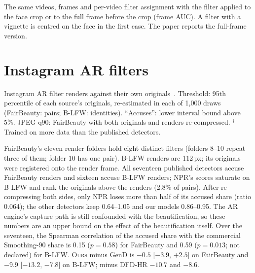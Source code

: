 \documentclass[10pt]{article}
\newcommand{\ours}{\textsc{Ours}}
\begin{document}
\begin{table}[H]
\centering
\caption{The same videos, frames and per-video filter assignment with the filter applied to the face crop or to the full frame
before the crop (frame AUC). A filter with a vignette is centred on the face in the first case. The paper reports the full-frame
version.}
\label{tab:fullframe}
\footnotesize
\begin{adjustbox}{max width=\linewidth}\end{adjustbox}
\end{table}

\section{Instagram AR filters}
\label{sec:ar}
\begin{table}[H]
\centering
\caption{Instagram AR filter renders against their own originals~\cite{openfilter2022}. Threshold: 95th percentile of each source's
originals, re-estimated in each of 1,000 draws (FairBeauty: pairs; B-LFW: identities). ``Accuses'': lower interval bound above
5\%. JPEG q90: FairBeauty with both originals and renders re-compressed. $^\dagger$Trained on more data than the published
detectors.}
\label{tab:ar}
\scriptsize
\begin{adjustbox}{max width=\linewidth}\end{adjustbox}
\end{table}
FairBeauty's eleven render folders hold eight distinct filters (folders 8--10 repeat three of them; folder 10 has one pair). B-LFW
renders are 112\,px; its originals were registered onto the render frame. All seventeen published detectors accuse FairBeauty
renders and sixteen accuse B-LFW renders; NPR's scores saturate on B-LFW and rank the originals above the renders (2.8\% of pairs).
After re-compressing both sides, only NPR loses more than half of its accused share (ratio 0.064); the other detectors keep
0.64--1.05 and our models 0.86--0.95. The AR engine's capture path is still confounded with the beautification, so these numbers
are an upper bound on the effect of the beautification itself. Over the seventeen, the Spearman correlation of the accused share
with the commercial Smoothing-90 share is 0.15 ($p=0.58$) for FairBeauty and 0.59 ($p=0.013$; not declared) for B-LFW. \ours{}
minus GenD is $-0.5$ [$-3.9$, $+2.5$] on FairBeauty and $-9.9$ [$-13.2$, $-7.8$] on B-LFW; minus DFD-HR $-10.7$ and $-8.6$.
\end{document}

